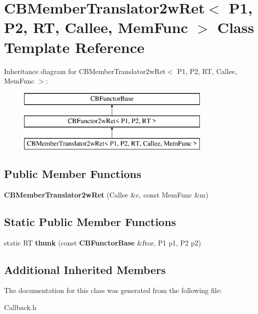 \section{C\+B\+Member\+Translator2w\+Ret$<$ P1, P2, RT, Callee, Mem\+Func $>$ Class Template Reference}
\label{classCBMemberTranslator2wRet}
Inheritance diagram for C\+B\+Member\+Translator2w\+Ret$<$ P1, P2, RT, Callee, Mem\+Func $>$\+:\begin{figure}[H]
\begin{center}
\leavevmode
\includegraphics[height=3.000000cm]{classCBMemberTranslator2wRet}
\end{center}
\end{figure}
\subsection*{Public Member Functions}
\begin{DoxyCompactItemize}
\item 
{\bfseries C\+B\+Member\+Translator2w\+Ret} (Callee \&c, const Mem\+Func \&m)\label{classCBMemberTranslator2wRet_af4e5eb13ea4b7e03e101f26e5292ae6f}

\end{DoxyCompactItemize}
\subsection*{Static Public Member Functions}
\begin{DoxyCompactItemize}
\item 
static RT {\bfseries thunk} (const {\bf C\+B\+Functor\+Base} \&ftor, P1 p1, P2 p2)\label{classCBMemberTranslator2wRet_a0360f997fe211b042449357b0661aa2c}

\end{DoxyCompactItemize}
\subsection*{Additional Inherited Members}


The documentation for this class was generated from the following file\+:\begin{DoxyCompactItemize}
\item 
Callback.\+h\end{DoxyCompactItemize}
